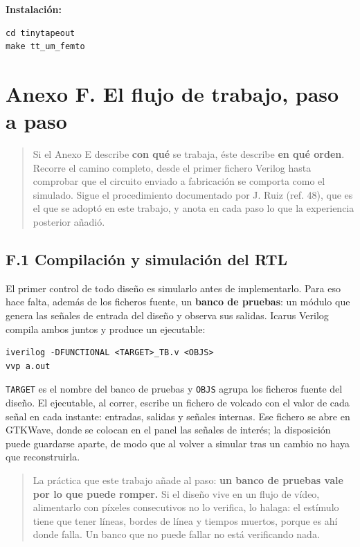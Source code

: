 \textbf{Instalación:}

\begin{verbatim}
cd tinytapeout
make tt_um_femto
\end{verbatim}

\section{Anexo F. El flujo de trabajo, paso a
paso}\label{anexo-f.-el-flujo-de-trabajo-paso-a-paso}

\begin{quote}
Si el Anexo E describe \textbf{con qué} se trabaja, éste describe
\textbf{en qué orden}. Recorre el camino completo, desde el primer
fichero Verilog hasta comprobar que el circuito enviado a fabricación se
comporta como el simulado. Sigue el procedimiento documentado por J.
Ruiz (ref. 48), que es el que se adoptó en este trabajo, y anota en cada
paso lo que la experiencia posterior añadió.
\end{quote}

\subsection{F.1 Compilación y simulación del
RTL}\label{f.1-compilaciuxf3n-y-simulaciuxf3n-del-rtl}

El primer control de todo diseño es simularlo antes de implementarlo.
Para eso hace falta, además de los ficheros fuente, un \textbf{banco de
pruebas}: un módulo que genera las señales de entrada del diseño y
observa sus salidas. Icarus Verilog compila ambos juntos y produce un
ejecutable:

\begin{verbatim}
iverilog -DFUNCTIONAL <TARGET>_TB.v <OBJS>
vvp a.out
\end{verbatim}

\texttt{TARGET} es el nombre del banco de pruebas y \texttt{OBJS} agrupa
los ficheros fuente del diseño. El ejecutable, al correr, escribe un
fichero de volcado con el valor de cada señal en cada instante:
entradas, salidas y señales internas. Ese fichero se abre en GTKWave,
donde se colocan en el panel las señales de interés; la disposición
puede guardarse aparte, de modo que al volver a simular tras un cambio
no haya que reconstruirla.

\begin{quote}
La práctica que este trabajo añade al paso: \textbf{un banco de pruebas
vale por lo que puede romper.} Si el diseño vive en un flujo de vídeo,
alimentarlo con píxeles consecutivos no lo verifica, lo halaga: el
estímulo tiene que tener líneas, bordes de línea y tiempos muertos,
porque es ahí donde falla. Un banco que no puede fallar no está
verificando nada.
\end{quote}


